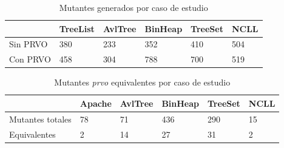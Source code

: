 \begin{table}[]
	\caption{Mutantes generados por caso de estudio}
	\label{tables.results.mutants}
	\centering
	\begin{tabular}{@{}l|lllll|@{}}
		\cmidrule(l){2-6}
		& TreeList & AvlTree & BinHeap & TreeSet & NCLL \\ \midrule
		\multicolumn{1}{|l|}{Sin PRVO} & 380 & 233 & 352 & 410 & 504 \\ \cmidrule(r){1-1}
		\multicolumn{1}{|l|}{Con PRVO} & 458 & 304 & 788 & 700 & 519 \\ \bottomrule
	\end{tabular}
\end{table}

\begin{table}[]
	\caption{Mutantes \emph{prvo} equivalentes por caso de estudio}
	\label{tables.results.equivalents}
	\centering
	\begin{tabular}{@{}l|lllll|@{}}
		\cmidrule(l){2-6}
		& Apache & AvlTree & BinHeap & TreeSet & NCLL \\ \midrule
		\multicolumn{1}{|l|}{Mutantes totales} & 78 & 71 & 436 & 290 & 15 \\ \cmidrule(r){1-1}
		\multicolumn{1}{|l|}{Equivalentes} & 2 & 14 & 27 & 31 & 2 \\ \bottomrule
	\end{tabular}
\end{table}

